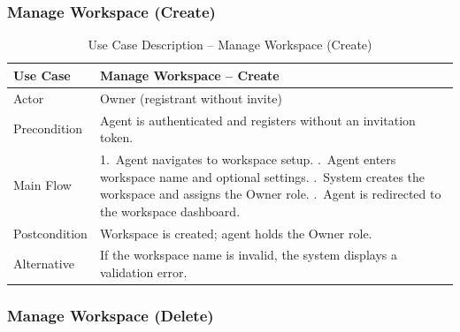 \documentclass[12pt,a4paper]{report}
\newcommand{\reporttablesetup}{%
  \small%
  \setlength{\tabcolsep}{5pt}%
  \renewcommand{\arraystretch}{1.22}%
  \arrayrulecolor{framegray}%
}
\begin{document}
\subsubsection{Manage Workspace (Create)}

\begin{table}[H]
  \centering
  \reporttablesetup
  \begin{tabularx}{\textwidth}{|p{3.1cm}|Y|}
    \hline
    Use Case     & Manage Workspace -- Create \\
    \hline
    Actor        & Owner (registrant without invite) \\
    \hline
    Precondition & Agent is authenticated and registers without an invitation token. \\
    \hline
    Main Flow    & 1.\ Agent navigates to workspace setup. .\ Agent enters workspace name and optional settings. .\ System creates the workspace and assigns the Owner role. .\ Agent is redirected to the workspace dashboard. \\
    \hline
    Postcondition & Workspace is created; agent holds the Owner role. \\
    \hline
    Alternative  & If the workspace name is invalid, the system displays a validation
                   error. \\
    \hline
  \end{tabularx}
  \caption{Use Case Description -- Manage Workspace (Create)}
  \label{tab:uc02}
\end{table}

\subsubsection{Manage Workspace (Delete)}
\end{document}
